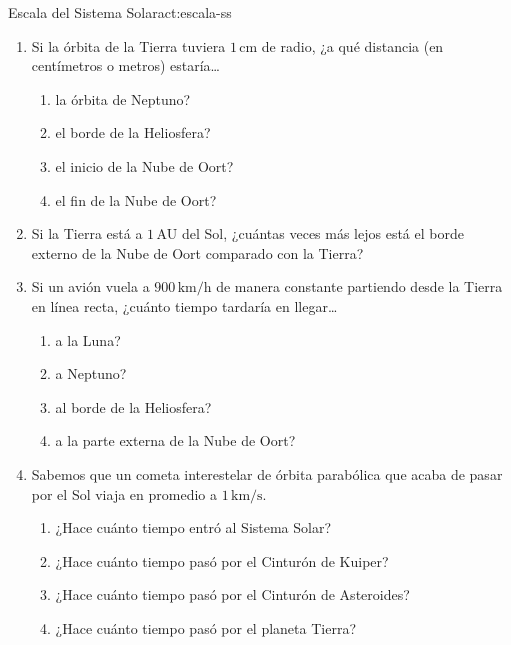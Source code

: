 \begin{actividad}{Escala del Sistema Solar}{act:escala-ss}
    \begin{enumerate}[leftmargin=1.5em, label=\arabic*.]

        \item Si la órbita de la Tierra tuviera $1\,\text{cm}$ de radio, ¿a qué
              distancia (en centímetros o metros) estaría\ldots
              \begin{enumerate}[leftmargin=1.5em, label=\alph*)]
                  \item la órbita de Neptuno?
                  \item el borde de la Heliosfera?
                  \item el inicio de la Nube de Oort?
                  \item el fin de la Nube de Oort?
              \end{enumerate}

        \item Si la Tierra está a $1\,\text{AU}$ del Sol, ¿cuántas veces más lejos
              está el borde externo de la Nube de Oort comparado con la Tierra?

        \item Si un avión vuela a $900\,\text{km/h}$ de manera constante partiendo
              desde la Tierra en línea recta, ¿cuánto tiempo tardaría en llegar\ldots
              \begin{enumerate}[leftmargin=1.5em, label=\alph*)]
                  \item a la Luna?
                  \item a Neptuno?
                  \item al borde de la Heliosfera?
                  \item a la parte externa de la Nube de Oort?
              \end{enumerate}

        \item Sabemos que un cometa interestelar de órbita parabólica que acaba de
              pasar por el Sol viaja en promedio a $1\,\text{km/s}$.
              \begin{enumerate}[leftmargin=1.5em, label=\alph*)]
                  \item ¿Hace cuánto tiempo entró al Sistema Solar?
                  \item ¿Hace cuánto tiempo pasó por el Cinturón de Kuiper?
                  \item ¿Hace cuánto tiempo pasó por el Cinturón de Asteroides?
                  \item ¿Hace cuánto tiempo pasó por el planeta Tierra?
              \end{enumerate}


\end{enumerate}
\end{actividad}
